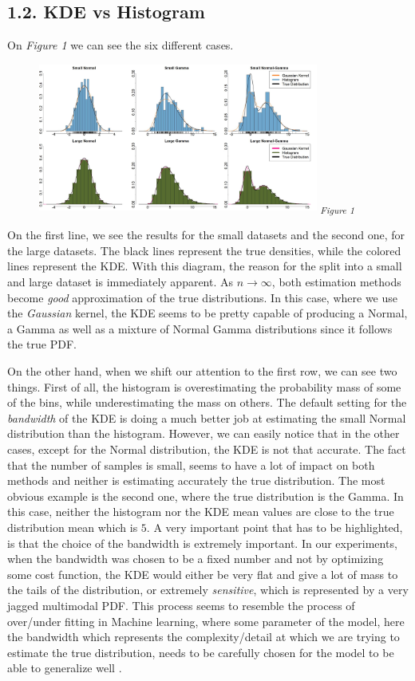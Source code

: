 \documentclass[fleqn, a4paper]{report}
\begin{document}
\subsection*{1.2. KDE vs Histogram}
On \textit{Figure 1} we can see the six different cases. 
\begin{figure}[!ht]
\includegraphics[width=0.82\textwidth]{./images/hist_vs_GKDE.jpg}
\textsubscript{\textit{Figure 1}}
\label{tab:fig_1}
\end{figure}
On the first line, we see the results for the small datasets and the second one, for the large datasets. The black lines represent the true densities, while the colored lines represent the KDE. With this diagram, the reason for the split into a small and large dataset is immediately apparent. As $n \rightarrow \infty$, both estimation methods become \textit{good} approximation of the true distributions. In this case, where we use the \textit{Gaussian} kernel, the KDE seems to be pretty capable of producing a Normal, a Gamma as well as a mixture of Normal Gamma distributions since it follows the true PDF. 

On the other hand, when we shift our attention to the first row, we can see two things. First of all, the histogram is overestimating the probability mass of some of the bins, while underestimating the mass on others. The default setting for the \textit{bandwidth} of the KDE is doing a much better job at estimating the small Normal distribution than the histogram. However, we can easily notice that in the other cases, except for the Normal distribution, the KDE is not that accurate. The fact that the number of samples is small, seems to have a lot of impact on both methods and neither is estimating accurately the true distribution. The most obvious example is the second one, where the true distribution is the Gamma. In this case, neither the histogram nor the KDE mean values are close to the true distribution mean which is $5$. A very important point that has to be highlighted, is that the choice of the bandwidth is extremely important. In our experiments, when the bandwidth was chosen to be a fixed number and not by optimizing some cost function, the KDE would either be very flat and give a lot of mass to the tails of the distribution, or extremely \textit{sensitive}, which is represented by a very jagged multimodal PDF. This process seems to resemble the process of over/under fitting in Machine learning, where some parameter of the model, here the bandwidth which represents the complexity/detail at which we are trying to estimate the true distribution, needs to be carefully chosen for the model to be able to generalize well \cite{murray_machine_2020}.
\end{document}
